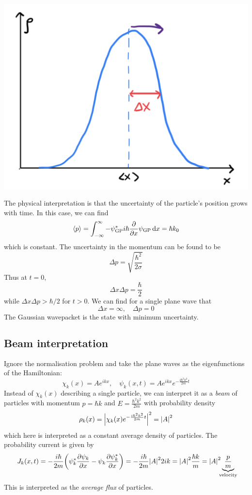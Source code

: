 \documentclass[a4paper,11pt]{article}
\begin{document}
\begin{center}
    \includegraphics[scale=0.15]{qm9.png}
\end{center}

The physical interpretation is that the uncertainty of the particle's position grows with time.
In this case, we can find
\[
	\left\langle{p}\right\rangle = \int_{-\infty}^\infty -\psi_{\text{GP}}^* i \hbar \pdv{x} \psi_{\text{GP}} \dd{x} = \hbar k_0
\]
which is constant.
The uncertainty in the momentum can be found to be
\[
	\Delta p=\sqrt{\frac{\hbar^2}{2 \sigma}}
\]
Thus at $t=0$, 
\[
	\Delta x \Delta p = \frac{\hbar}{2}
\]
while $\Delta x \Delta p>\hbar / 2$ for $t>0$.
We can find for a single plane wave that
\[
	\Delta x = \infty,\quad \Delta p = 0
\]
The Gaussian wavepacket is the state with minimum uncertainty.

\subsection{Beam interpretation}

Ignore the normalisation problem and take the plane waves as the eigenfunctions of the Hamiltonian:
\[
	\chi_k(x) = Ae^{ikx},\quad \psi_k(x,t) = Ae^{ikx}e^{-\frac{i \hbar^2 k^2}{2m} t}
\]
Instead of \( \chi_k(x) \) describing a single particle, we can interpret it as a \textit{beam} of particles with momentum \( p = \hbar k \) and \( E = \frac{\hbar^2 k^2}{2m} \) with probability density
\[
	\rho_k(x) = \abs{\chi_k(x) e^{-\frac{i\hbar^2 k^2}{2m}t}}^2 = \abs{A}^2
\]
which here is interpreted as a constant average density of particles.
The probability current is given by
\[
	J_k(x,t) = - \frac{i\hbar}{2m} \qty(\psi^*_k \pdv{\psi_k}{x} - \psi_k \pdv{\psi_k^*}{x}) = -\frac{i\hbar}{2m} \abs{A}^2 2ik = \abs{A}^2 \frac{\hbar k}{m} = \abs{A}^2 \underbrace{\frac{p}{m}}_{\mathclap{\text{velocity}}}
\]
This is interpreted as the \textit{average flux} of particles.
\end{document}
